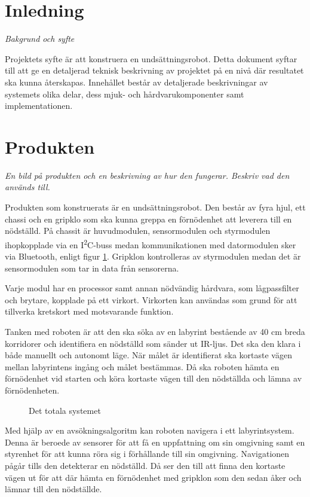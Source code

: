 \documentclass[11pt]{article}
\begin{document}
\begin{flushleft}
\section{Inledning}
\textit{Bakgrund och syfte}

Projektets syfte är att konstruera en undsättningsrobot. Detta dokument syftar till att ge en detaljerad teknisk beskrivning av projektet på en nivå där resultatet ska kunna återskapas. Innehållet består av detaljerade beskrivningar av systemets olika delar, dess mjuk- och hårdvarukomponenter samt implementationen.

\section{Produkten}
\textit{En bild på produkten och en beskrivning av hur den fungerar. Beskriv vad den används till.}

Produkten som konstruerats är en undsättningsrobot. Den består av fyra hjul, ett chassi och en gripklo som ska kunna greppa en förnödenhet att leverera till en nödställd. På chassit är huvudmodulen, sensormodulen och styrmodulen ihopkopplade via en I\textsuperscript{2}C-buss medan kommunikationen med datormodulen sker via Bluetooth\textsuperscript{\circledR}, enligt figur \ref{overview}. Gripklon kontrolleras av styrmodulen medan det är sensormodulen som tar in data från sensorerna.

Varje modul har en processor samt annan nödvändig hårdvara, som lågpassfilter och brytare, kopplade på ett virkort. Virkorten kan användas som grund för att tillverka kretskort med motsvarande funktion. 

Tanken med roboten är att den ska söka av en labyrint bestående av 40 cm breda korridorer och identifiera en nödställd som sänder ut IR-ljus. Det ska den klara i både manuellt och autonomt läge. När målet är identifierat ska kortaste vägen mellan labyrintens ingång och målet bestämmas. Då ska roboten hämta en förnödenhet vid starten och köra kortaste vägen till den nödställda och lämna av förnödenheten. 


\begin{figure}[!htbp]
\centering
\noindent\resizebox{\linewidth}{!}{
	}
	\caption{Det totala systemet \label{overview}}	
\end{figure}

\pagebreak

Med hjälp av en avsökningsalgoritm kan roboten navigera i ett labyrintsystem. Denna är beroede av sensorer för att få en uppfattning om sin omgivning samt en styrenhet för att kunna röra sig i förhållande till sin omgivning. Navigationen pågår tills den detekterar en nödställd. Då ser den till att finna den kortaste vägen ut för att där hämta en förnödenhet med gripklon som den sedan åker och lämnar till den nödställde. 


\end{flushleft}
\end{document}
